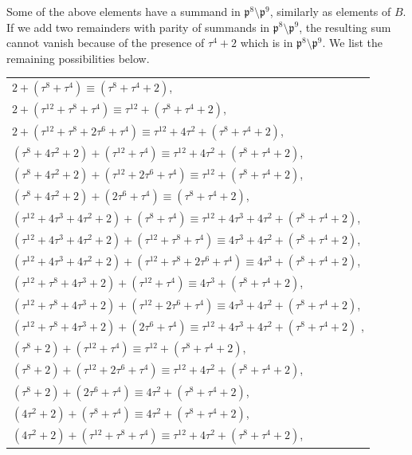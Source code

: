 \documentclass[12pt]{article}
\theoremstyle{remark}
\newcommand{\p}{\mathfrak{p}}
\begin{document}
Some of the above elements have a summand in $\mathfrak{p}^8\setminus\p^9$, similarly as elements of $B$. If we add two remainders with parity of summands in $\p^8\setminus\p^9$, the resulting sum cannot vanish because of the presence of $\tau^4+2$ which is in  $\p^8\setminus\p^9$. We list the remaining possibilities below.
\begin{center}
\begin{tabular}{@{}l@{}}
    $2 + (\tau^8+\tau^4) \equiv (\tau^8+\tau^4+2)$,\\
    $2 + (\tau^{12}+\tau^8+\tau^4) \equiv \tau^{12}+(\tau^8+\tau^4+2)$,\\
    $2 + ( \tau^{12}+\tau^8+2\tau^6+\tau^4) \equiv \tau^{12}+4\tau^2+(\tau^8+\tau^4+2)$,\\
    $(\tau^8+4\tau^2+2) + (\tau^{12}+\tau^4) \equiv \tau^{12}+4\tau^2+ (\tau^8+\tau^4+2)$,\\
    $(\tau^8+4\tau^2+2) + (\tau^{12}+2\tau^6+\tau^4) \equiv \tau^{12}+(\tau^8+\tau^4+2)$,\\
    $(\tau^8+4\tau^2+2) + (2\tau^6+\tau^4) \equiv (\tau^8+\tau^4+2)$,\\
    $(\tau^{12}+4\tau^3+4\tau^2+2)+ (\tau^8+\tau^4) \equiv \tau^{12}+4\tau^3+4\tau^2+(\tau^8+\tau^4+2) $,\\
    $(\tau^{12}+4\tau^3+4\tau^2+2)+(\tau^{12}+\tau^8+\tau^4) \equiv 4\tau^3+4\tau^2+(\tau^8+\tau^4+2) $,\\
    $(\tau^{12}+4\tau^3+4\tau^2+2)+( \tau^{12}+\tau^8+2\tau^6+\tau^4) \equiv 4\tau^3+(\tau^8+\tau^4+2) $,\\
    $(\tau^{12}+\tau^8+4\tau^3+2) + (\tau^{12}+\tau^4) \equiv 4\tau^3 + (\tau^8+\tau^4+2)  $,\\
    $(\tau^{12}+\tau^8+4\tau^3+2) + (\tau^{12}+2\tau^6+\tau^4) \equiv 4\tau^3+4\tau^2+(\tau^8+\tau^4+2)$,\\
    $(\tau^{12}+\tau^8+4\tau^3+2) + (2\tau^6+\tau^4) \equiv \tau^{12}+4\tau^3+4\tau^2+(\tau^8+\tau^4+2)$ ,\\
    $(\tau^8+2) + (\tau^{12}+\tau^4) \equiv \tau^{12}+(\tau^8+\tau^4+2) $, \\
    $(\tau^8+2) + (\tau^{12}+2\tau^6+\tau^4) \equiv \tau^{12}+4\tau^2+(\tau^8+\tau^4+2)$, \\
    $(\tau^8+2) + (2\tau^6+\tau^4) \equiv 4\tau^2+(\tau^8+\tau^4+2)$, \\
    $(4\tau^2+2) + (\tau^8+\tau^4) \equiv 4\tau^2+(\tau^8+\tau^4+2) $, \\
    $(4\tau^2+2) + (\tau^{12}+\tau^8+\tau^4) \equiv \tau^{12}+4\tau^2+(\tau^8+\tau^4+2) $, \\
    

\end{tabular}
\end{center}
\end{document}
